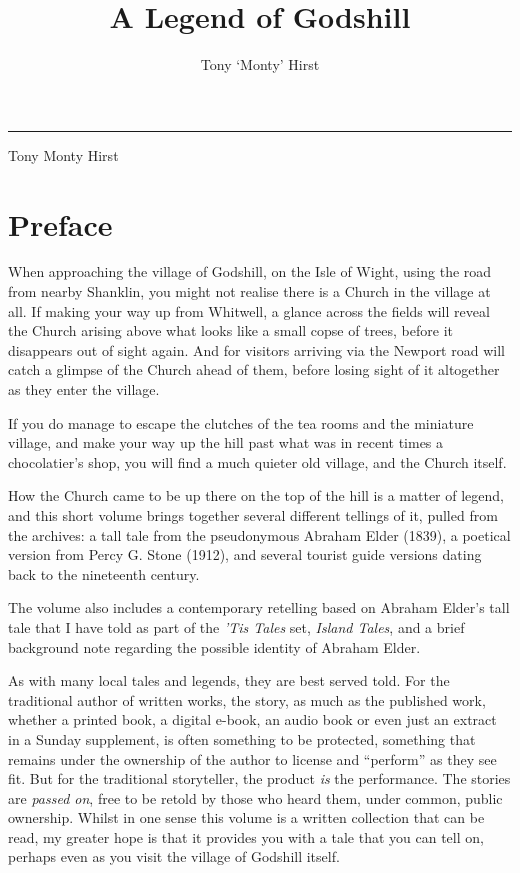 \documentclass[
  12pt,
  a5paper,
  twoside]{book}
\date{}
\title{A Legend of Godshill}
\author{Tony `Monty' Hirst}
\date{}
\makeatletter
\let\origtableofcontents\tableofcontents
\renewcommand{\tableofcontents}{%
    \cleardoublepage
    \pagestyle{plain}
    \origtableofcontents
    \cleardoublepage
    \pagestyle{normal} 
  }
\renewcommand{\maketitle}{%
  \thispagestyle{plain}
  \noindent\rule{\linewidth}{1pt}\par
  \begingroup
    \hypersetup{pdfauthor={\@author}, pdftitle={\@title}}%
  \endgroup
  \begin{flushright}
    \vspace{48pt}
    {\headingfont
    {\fontsize{44pt}{56pt}\selectfont \setlength{\baselineskip}{56pt}%
    \@title\par}
    \vspace{96pt}
    {\Large Tony {\textquotesingle}Monty{\textquotesingle} Hirst}\par
    
    \vspace{25pt}
    \@date \par

    }
  \end{flushright}

  

  \setcounter{footnote}{0}
  \let\thanks\relax\let\maketitle\relax
}
\renewcommand*\contentsname{Table of contents}
\newcommand\contentsname{Table of contents}
\makeatother
\begin{document}
\frontmatter
\maketitle

\renewcommand*\contentsname{Contents}
{
\setcounter{tocdepth}{0}
\tableofcontents
}

\mainmatter
{}

\chapter{Preface}\label{preface}

When approaching the village of Godshill, on the Isle of Wight, using
the road from nearby Shanklin, you might not realise there is a Church
in the village at all. If making your way up from Whitwell, a glance
across the fields will reveal the Church arising above what looks like a
small copse of trees, before it disappears out of sight again. And for
visitors arriving via the Newport road will catch a glimpse of the
Church ahead of them, before losing sight of it altogether as they enter
the village.

If you do manage to escape the clutches of the tea rooms and the
miniature village, and make your way up the hill past what was in recent
times a chocolatier's shop, you will find a much quieter old village,
and the Church itself.

How the Church came to be up there on the top of the hill is a matter of
legend, and this short volume brings together several different tellings
of it, pulled from the archives: a tall tale from the pseudonymous
Abraham Elder (1839), a poetical version from Percy G. Stone (1912), and
several tourist guide versions dating back to the nineteenth century.

The volume also includes a contemporary retelling based on Abraham
Elder's tall tale that I have told as part of the \emph{'Tis Tales} set,
\emph{Island Tales}, and a brief background note regarding the possible
identity of Abraham Elder.

As with many local tales and legends, they are best served told. For the
traditional author of written works, the story, as much as the published
work, whether a printed book, a digital e-book, an audio book or even
just an extract in a Sunday supplement, is often something to be
protected, something that remains under the ownership of the author to
license and ``perform'' as they see fit. But for the traditional
storyteller, the product \emph{is} the performance. The stories are
\emph{passed on}, free to be retold by those who heard them, under
common, public ownership. Whilst in one sense this volume is a written
collection that can be read, my greater hope is that it provides you
with a tale that you can tell on, perhaps even as you visit the village
of Godshill itself.
\end{document}
